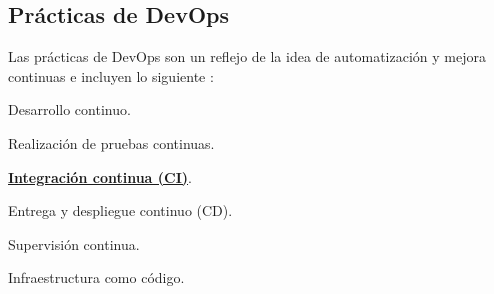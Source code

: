 \subsection{Prácticas de DevOps}
Las prácticas de DevOps son un reflejo de la idea de automatización y mejora continuas e incluyen lo siguiente \cite{netAppDevOps}:
\begin{compactitem}
    \item Desarrollo continuo.
    \item Realización de pruebas continuas.
    \item \textbf{\underline{Integración continua (CI)}}.%
    \item Entrega y despliegue continuo (CD).
    \item Supervisión continua.
    \item Infraestructura como código.
\end{compactitem}


